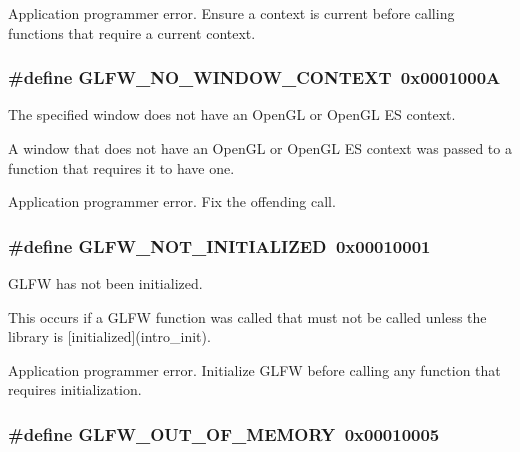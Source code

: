 Application programmer error. Ensure a context is current before calling functions that require a current context. \hypertarget{group__errors_gcff24d2757da752ae4c80bf452356487}{
\subsubsection[GLFW\_\-NO\_\-WINDOW\_\-CONTEXT]{\setlength{\rightskip}{0pt plus 5cm}\#define GLFW\_\-NO\_\-WINDOW\_\-CONTEXT~0x0001000A}}
\label{group__errors_gcff24d2757da752ae4c80bf452356487}


The specified window does not have an OpenGL or OpenGL ES context. 

A window that does not have an OpenGL or OpenGL ES context was passed to a function that requires it to have one.

Application programmer error. Fix the offending call. \hypertarget{group__errors_g2374ee02c177f12e1fa76ff3ed15e14a}{
\subsubsection[GLFW\_\-NOT\_\-INITIALIZED]{\setlength{\rightskip}{0pt plus 5cm}\#define GLFW\_\-NOT\_\-INITIALIZED~0x00010001}}
\label{group__errors_g2374ee02c177f12e1fa76ff3ed15e14a}


GLFW has not been initialized. 

This occurs if a GLFW function was called that must not be called unless the library is \mbox{[}initialized\mbox{]}(intro\_\-init).

Application programmer error. Initialize GLFW before calling any function that requires initialization. \hypertarget{group__errors_g9023953a2bcb98c2906afd071d21ee7f}{
\subsubsection[GLFW\_\-OUT\_\-OF\_\-MEMORY]{\setlength{\rightskip}{0pt plus 5cm}\#define GLFW\_\-OUT\_\-OF\_\-MEMORY~0x00010005}}
\label{group__errors_g9023953a2bcb98c2906afd071d21ee7f}



